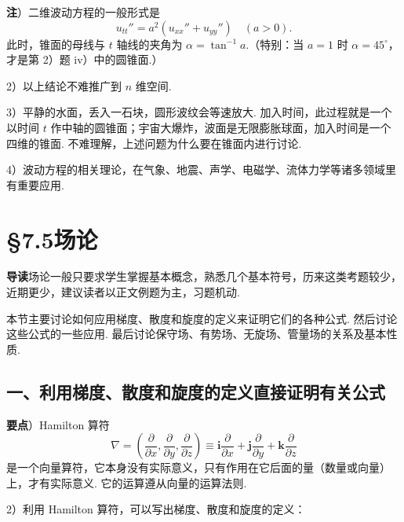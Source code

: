 \documentclass[UTF8,12pt,a4paper,fontset=fandol]{ctexart}
\begin{document}
\noindent\textbf{注}）二维波动方程的一般形式是
\[
u_{tt}''=a^2(u_{xx}''+u_{yy}'')\quad(a>0).
\]
此时，锥面的母线与 $t$ 轴线的夹角为 $\alpha=\tan^{-1}a$.（特别：当 $a=1$ 时 $\alpha=45^\circ$，才是第 2）题 iv）中的圆锥面.）

2）以上结论不难推广到 $n$ 维空间.

3）平静的水面，丢入一石块，圆形波纹会等速放大. 加入时间，此过程就是一个以时间 $t$ 作中轴的圆锥面；宇宙大爆炸，波面是无限膨胀球面，加入时间是一个四维的锥面. 不难理解，上述问题为什么要在锥面内进行讨论.

4）波动方程的相关理论，在气象、地震、声学、电磁学、流体力学等诸多领域里有重要应用.

\section*{§7.5\quad 场\quad 论}

\noindent\textbf{导读}\quad 场论一般只要求学生掌握基本概念，熟悉几个基本符号，历来这类考题较少，近期更少，建议读者以正文例题为主，习题机动.

本节主要讨论如何应用梯度、散度和旋度的定义来证明它们的各种公式. 然后讨论这些公式的一些应用. 最后讨论保守场、有势场、无旋场、管量场的关系及基本性质.

\subsection*{一、利用梯度、散度和旋度的定义直接证明有关公式}

\noindent\textbf{要点}）Hamilton 算符
\[
\nabla=\left(\frac{\partial}{\partial x},\frac{\partial}{\partial y},\frac{\partial}{\partial z}\right)
\equiv\mathbf i\frac{\partial}{\partial x}+\mathbf j\frac{\partial}{\partial y}+\mathbf k\frac{\partial}{\partial z}
\]
是一个向量算符，它本身没有实际意义，只有作用在它后面的量（数量或向量）上，才有实际意义. 它的运算遵从向量的运算法则.

2）利用 Hamilton 算符，可以写出梯度、散度和旋度的定义：
\end{document}
